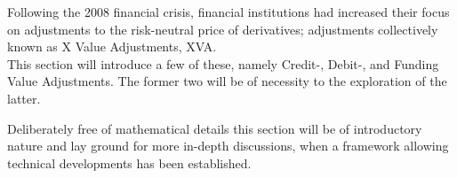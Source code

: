 \documentclass[main.tex]{subfiles}
\begin{document}
    Following the 2008 financial crisis,
    financial institutions had increased their focus on 
    adjustments to the risk-neutral price of derivatives;
    adjustments collectively known as X Value Adjustments, XVA. \\
    This section will introduce a few of these, 
    namely Credit-, Debit-, and Funding Value Adjustments.
    The former two will be of necessity to the exploration of the latter.

    Deliberately free of mathematical details this section will be of introductory nature 
    and lay ground for more in-depth discussions, 
    when a framework allowing technical developments has been established.
\end{document}
